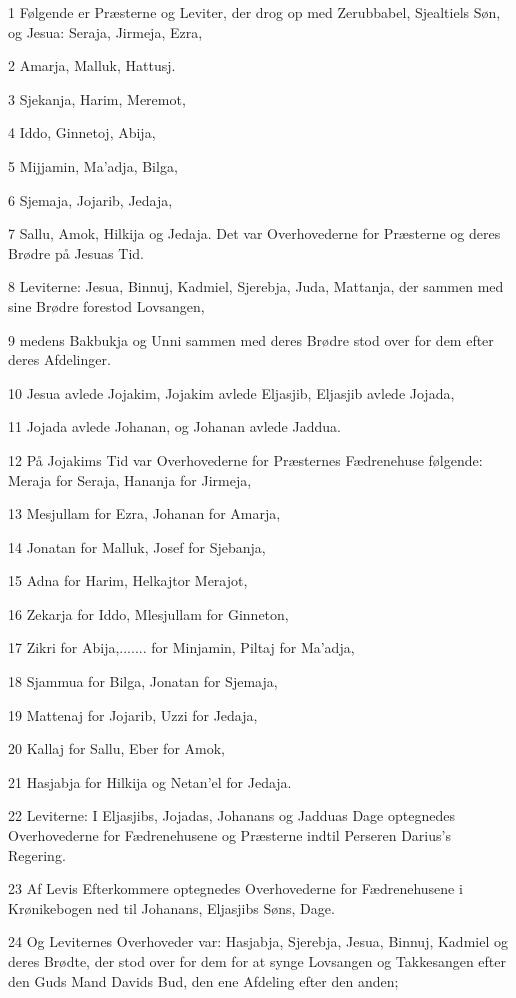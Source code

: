 \par 1 Følgende er Præsterne og Leviter, der drog op med Zerubbabel, Sjealtiels Søn, og Jesua: Seraja, Jirmeja, Ezra,
\par 2 Amarja, Malluk, Hattusj.
\par 3 Sjekanja, Harim, Meremot,
\par 4 Iddo, Ginnetoj, Abija,
\par 5 Mijjamin, Ma'adja, Bilga,
\par 6 Sjemaja, Jojarib, Jedaja,
\par 7 Sallu, Amok, Hilkija og Jedaja. Det var Overhovederne for Præsterne og deres Brødre på Jesuas Tid.
\par 8 Leviterne: Jesua, Binnuj, Kadmiel, Sjerebja, Juda, Mattanja, der sammen med sine Brødre forestod Lovsangen,
\par 9 medens Bakbukja og Unni sammen med deres Brødre stod over for dem efter deres Afdelinger.
\par 10 Jesua avlede Jojakim, Jojakim avlede Eljasjib, Eljasjib avlede Jojada,
\par 11 Jojada avlede Johanan, og Johanan avlede Jaddua.
\par 12 På Jojakims Tid var Overhovederne for Præsternes Fædrenehuse følgende: Meraja for Seraja, Hananja for Jirmeja,
\par 13 Mesjullam for Ezra, Johanan for Amarja,
\par 14 Jonatan for Malluk, Josef for Sjebanja,
\par 15 Adna for Harim, Helkajtor Merajot,
\par 16 Zekarja for Iddo, Mlesjullam for Ginneton,
\par 17 Zikri for Abija,....... for Minjamin, Piltaj for Ma'adja,
\par 18 Sjammua for Bilga, Jonatan for Sjemaja,
\par 19 Mattenaj for Jojarib, Uzzi for Jedaja,
\par 20 Kallaj for Sallu, Eber for Amok,
\par 21 Hasjabja for Hilkija og Netan'el for Jedaja.
\par 22 Leviterne: I Eljasjibs, Jojadas, Johanans og Jadduas Dage optegnedes Overhovederne for Fædrenehusene og Præsterne indtil Perseren Darius's Regering.
\par 23 Af Levis Efterkommere optegnedes Overhovederne for Fædrenehusene i Krønikebogen ned til Johanans, Eljasjibs Søns, Dage.
\par 24 Og Leviternes Overhoveder var: Hasjabja, Sjerebja, Jesua, Binnuj, Kadmiel og deres Brødte, der stod over for dem for at synge Lovsangen og Takkesangen efter den Guds Mand Davids Bud, den ene Afdeling efter den anden;
